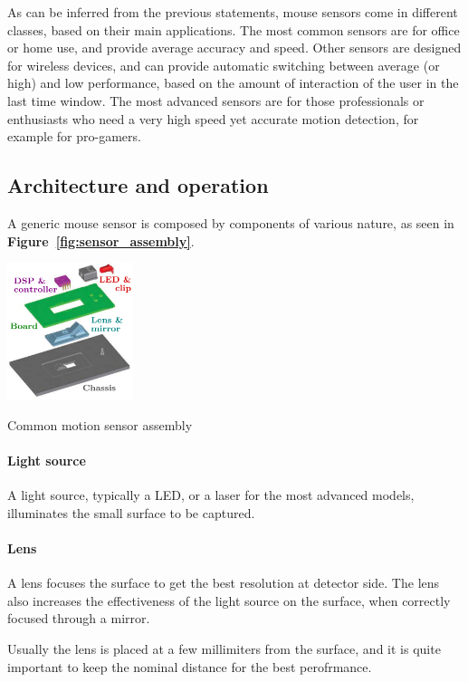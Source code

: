\documentclass[a4paper,10pt]{article}
\makeatletter
\newenvironment{figurehere}{\def\@captype{figure}\vspace{2ex}}{\vspace{2ex}}
\newcommand{\citef}[1]{\textbf{Figure~\ref{#1}}}
\makeatother
\begin{document}
\begin{multicols}{2}
As can be inferred from the previous statements, mouse sensors come in
different classes, based on their main applications. The most common sensors
are for office or home use, and provide average accuracy and speed. Other
sensors are designed for wireless devices, and can provide automatic switching
between average (or high) and low performance, based on the amount of
interaction of the user in the last time window. The most advanced sensors are
for those professionals or enthusiasts who need a very high speed yet accurate
motion detection, for example for pro-gamers.


\subsection{Architecture and operation}

A generic mouse sensor is composed by components of various nature, as seen
in \citef{fig:sensor_assembly}.

\begin{figurehere}
	\centering
	\includegraphics[keepaspectratio=true,height=4cm]{images/sensor_assembly.pdf}
	\caption{Common motion sensor assembly}
	\label{fig:sensor_assembly}
\end{figurehere}


\paragraph{Light source}
A light source, typically a LED, or a laser for the most advanced models,
illuminates the small surface to be captured.


\paragraph{Lens}
A lens focuses the surface to get the best resolution at detector side.
The lens also increases the effectiveness of the light source on the surface,
when correctly focused through a mirror.

Usually the lens is placed at a few millimiters from the surface, and
it is quite important to keep the nominal distance for the best perofrmance.



\end{multicols}
\end{document}
